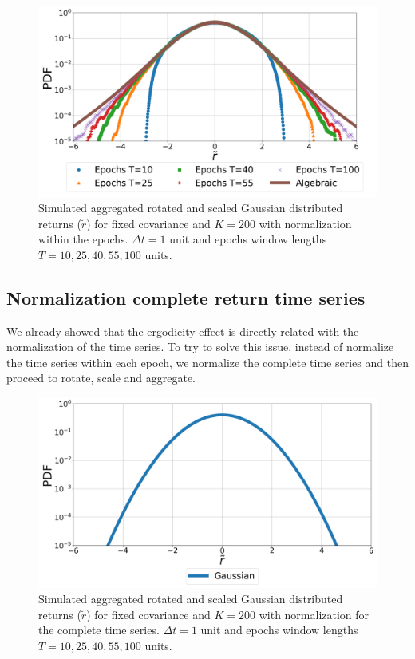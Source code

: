 \begin{figure}[htbp]
    \centering
    \includegraphics[width=0.6\columnwidth]
    {figures/06_epochs_sim_alg_agg_ret_pairs_norm.png}
    \caption{Simulated aggregated rotated and scaled Gaussian distributed
             returns ($\tilde{r}$) for fixed covariance and $K=200$ with
             normalization within the epochs. $\Delta t = 1$ unit and epochs
             window lengths $T=10, 25, 40, 55, 100$ units.}
    \label{fig:epochs_alg_agg_ret_pairs_norm}
\end{figure}

\subsection{Normalization complete return time series}
\label{subsec:norm_full_sim}

We already showed that the ergodicity effect is directly related with the
normalization of the time series. To try to solve this issue, instead of
normalize the time series within each epoch, we normalize the complete time
series and then proceed to rotate, scale and aggregate.

\begin{figure}[htbp]
    \centering
    \includegraphics[width=0.6\columnwidth]
    {figures/06_epochs_sim_gauss_ts_norm.png}
    \caption{Simulated aggregated rotated and scaled Gaussian distributed
             returns ($\tilde{r}$) for fixed covariance and $K=200$ with
             normalization for the complete time series. $\Delta t = 1$ unit
             and epochs window lengths $T=10, 25, 40, 55, 100$ units.}
    \label{fig:epochs_gauss_agg_ret_pairs_norm_full_ts}
\end{figure}

